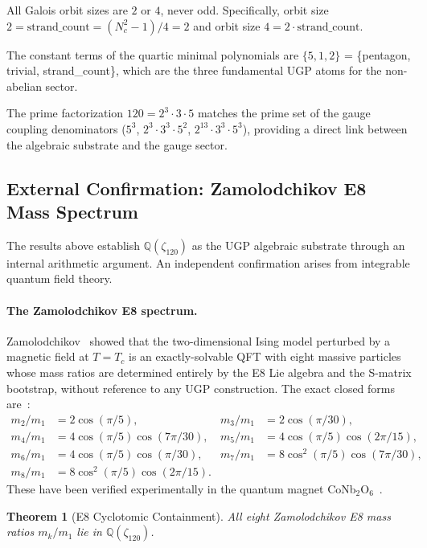 \documentclass[11pt]{article}
\newtheorem{theorem}{Theorem}[section]
\theoremstyle{remark}
\newcommand{\Nc}{N_c}
\newcommand{\zetaN}[1]{\zeta_{#1}}
\begin{document}
All Galois orbit sizes are $2$ or $4$, never odd.
Specifically, orbit size $2 = \mathrm{strand\_count} = (\Nc^2-1)/4 = 2$
and orbit size $4 = 2 \cdot \mathrm{strand\_count}$.

The constant terms of the quartic minimal polynomials are $\{5, 1, 2\}$ =
\{pentagon, trivial, strand\_count\}, which are the three fundamental UGP atoms
for the non-abelian sector.

The prime factorization $120 = 2^3 \cdot 3 \cdot 5$ matches the prime set of the gauge
coupling denominators ($5^3$, $2^3 \cdot 3^3 \cdot 5^2$, $2^{13} \cdot 3^3 \cdot 5^3$),
providing a direct link between the algebraic substrate and the gauge sector.

\subsection{External Confirmation: Zamolodchikov E8 Mass Spectrum}
\label{sec:e8_confirmation}

The results above establish $\mathbb{Q}(\zetaN{120})$ as the UGP algebraic substrate
through an internal arithmetic argument.  An independent confirmation arises from
integrable quantum field theory.

\paragraph{The Zamolodchikov E8 spectrum.}
Zamolodchikov~\cite{Zamolodchikov1989} showed that the two-dimensional Ising model
perturbed by a magnetic field at $T = T_c$ is an exactly-solvable QFT with eight
massive particles whose mass ratios are determined entirely by the E8 Lie algebra
and the S-matrix bootstrap, without reference to any UGP construction.  The exact
closed forms are~\cite{Zamolodchikov1989,DelfinoMussardo1995}:
\begin{align*}
m_2/m_1 &= 2\cos(\pi/5),  &  m_3/m_1 &= 2\cos(\pi/30), \\
m_4/m_1 &= 4\cos(\pi/5)\cos(7\pi/30),  &  m_5/m_1 &= 4\cos(\pi/5)\cos(2\pi/15), \\
m_6/m_1 &= 4\cos(\pi/5)\cos(\pi/30),   &  m_7/m_1 &= 8\cos^2(\pi/5)\cos(7\pi/30), \\
m_8/m_1 &= 8\cos^2(\pi/5)\cos(2\pi/15).
\end{align*}
These have been verified experimentally in the quantum magnet
CoNb$_2$O$_6$~\cite{ColdeaEtAl2010}.

\begin{theorem}[E8 Cyclotomic Containment]
\label{thm:e8_containment}
All eight Zamolodchikov E8 mass ratios $m_k/m_1$ lie in $\mathbb{Q}(\zetaN{120})$.
\end{theorem}
\end{document}

